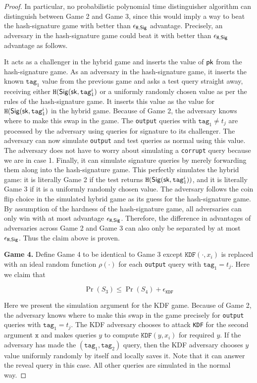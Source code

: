 \documentclass{article}
\begin{document}
\begin{proof}
In particular, no probabilistic polynomial time distinguisher algorithm can distinguish between Game 2 and Game 3, since this would imply a way to beat the hash-signature game with better than $\epsilon_{\texttt{H}, \mathsf{Sig}}$ advantage. Precisely, an adversary in the hash-signature game could beat it with better than $\epsilon_{\texttt{H}, \mathsf{Sig}}$ advantage as follows. 

It acts as a challenger in the hybrid game and inserts the value of $\mathsf{pk}$ from the hash-signature game. As an adversary in the hash-signature game, it inserts the known $\texttt{tag}_1$ value from the previous game and asks a test query straight away, receiving either $ \texttt{H}(\mathsf{Sig} (\mathsf{sk}, \texttt{tag}_1^i)$ or a uniformly randomly chosen value as per the rules of the hash-signature game. It inserts this value as the value for $ \texttt{H}(\mathsf{Sig} (\mathsf{sk}, \texttt{tag}_1^i)$ in the hybrid game. Because of Game 2, the adversary knows where to make this swap in the game. The \texttt{output} queries with $\texttt{tag}_1 \neq t_j$ are processed by the adversary using queries for signature to its challenger.  The adversary can now simulate \texttt{output} and test queries as normal using this value. The adversary does not have to worry about simulating a \texttt{corrupt} query because we are in case 1. Finally, it can simulate signature queries by merely forwarding them along into the hash-signature game. This perfectly simulates the hybrid game: it is literally Game 2 if the test returns $ \texttt{H}(\mathsf{Sig} (\mathsf{sk}, \texttt{tag}_1^i))$, and it is literally Game 3 if it is a uniformly randomly chosen value. The adversary follows the coin flip choice in the simulated hybrid game as its guess for the hash-signature game. By assumption of the hardness of the hash-signature game, all adversaries can only win with at most advantage $\epsilon_{\texttt{H}, \mathsf{Sig}}$. Therefore, the difference in advantages of adversaries across Game 2 and Game 3 can also only be separated by at most $\epsilon_{\texttt{H}, \mathsf{Sig}}$. Thus the claim above is proven.

\noindent \textbf{Game 4.} Define Game 4 to be identical to Game 3 except 
$\texttt{KDF}(\cdot, x_i)$ is replaced with an ideal random function $\rho(\cdot)$ for each \texttt{output} query with $\texttt{tag}_1 =t_j$. Here we claim that

$$
\Pr(S_3) \le \Pr(S_4) + \epsilon_{\texttt{KDF}}
$$

Here we present the simulation argument for the KDF game. Because of Game 2, the adversary knows where to make this swap in the game precisely for \texttt{output} queries with  $\texttt{tag}_1 =t_j$. The KDF adversary chooses to attack \texttt{KDF} for the second argument $\texttt{x}$ and makes queries $y$ to compute $\texttt{KDF}(y, x_i)$ for required $y$.  If the adversary has made the $(\texttt{tag}_1,\texttt{tag}_2)$ query, then the KDF adversary chooses $y$ value uniformly randomly by itself and locally saves it. Note that it can answer the reveal query in this case. All other queries are simulated in the normal way. 


\end{proof}
\end{document}
